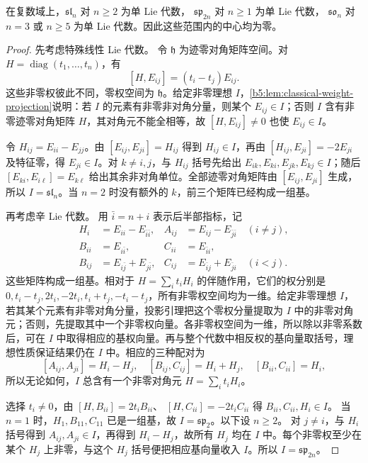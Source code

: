 \begin{proposition}\label{b5:prop:classical-simple}
	在复数域上，\(\mathfrak{sl}_n\) 对 \(n\ge2\) 为单 Lie 代数， \(\mathfrak{sp}_{2n}\) 对 \(n\ge1\) 为单 Lie 代数， \(\mathfrak{so}_n\) 对 \(n=3\) 或 \(n\ge5\) 为单 Lie 代数。因此这些范围内的中心均为零。
\end{proposition}
\begin{proof}
	先考虑特殊线性 Lie 代数。 令 \(\mathfrak h\) 为迹零对角矩阵空间。对 \(H=\operatorname{diag}(t_1,\ldots,t_n)\)，有
	\[
		[H,E_{ij}]=(t_i-t_j)E_{ij}.
	\]
	这些非零权彼此不同，零权空间为 \(\mathfrak h\)。给定非零理想 \(I\)，\cref{b5:lem:classical-weight-projection}说明：若 \(I\) 的元素有非零非对角分量，则某个 \(E_{ij}\in I\)；否则 \(I\) 含有非零迹零对角矩阵 \(H\)，其对角元不能全相等，故 \([H,E_{ij}]\ne0\) 也使 \(E_{ij}\in I\)。

	令 \(H_{ij}=E_{ii}-E_{jj}\)。由 \([E_{ij},E_{ji}]=H_{ij}\) 得到 \(H_{ij}\in I\)，再由 \([H_{ij},E_{ji}]=-2E_{ji}\) 及特征零，得 \(E_{ji}\in I\)。对 \(k\ne i,j\)，与 \(H_{ij}\) 括号先给出 \(E_{ik},E_{ki},E_{jk},E_{kj}\in I\)；随后 \([E_{ki},E_{i\ell}]=E_{k\ell}\) 给出其余非对角单位。全部迹零对角矩阵由 \([E_{ij},E_{ji}]\) 生成，所以 \(I=\mathfrak{sl}_n\)。当 \(n=2\) 时没有额外的 \(k\)，前三个矩阵已经构成一组基。

	再考虑辛 Lie 代数。 用 \(\bar i=n+i\) 表示后半部指标，记
	\[
		\begin{aligned}
			H_i&=E_{ii}-E_{\bar i\bar i},& A_{ij}&=E_{ij}-E_{\bar j\bar i}\quad(i\ne j),\\
			B_{ii}&=E_{i\bar i},& C_{ii}&=E_{\bar i i},\\
			B_{ij}&=E_{i\bar j}+E_{j\bar i},& C_{ij}&=E_{\bar i j}+E_{\bar j i}\quad(i<j).
		\end{aligned}
	\]
	这些矩阵构成一组基。相对于 \(H=\sum_i t_iH_i\) 的伴随作用，它们的权分别是 \(0,t_i-t_j,2t_i,-2t_i,t_i+t_j,-t_i-t_j\)，所有非零权空间均为一维。给定非零理想 \(I\)，若其某个元素有非零对角分量，投影引理把这个零权分量提取为 \(I\) 中的非零对角元；否则，先提取其中一个非零权向量。各非零权空间为一维，所以除以非零系数后，可在 \(I\) 中取得相应的基权向量。再与整个代数中相反权的基向量取括号，理想性质保证结果仍在 \(I\) 中。相应的三种配对为
	\[
		[A_{ij},A_{ji}]=H_i-H_j,\quad [B_{ij},C_{ij}]=H_i+H_j,\quad [B_{ii},C_{ii}]=H_i,
	\]
	所以无论如何，\(I\) 总含有一个非零对角元 \(H=\sum_i t_iH_i\)。

	选择 \(t_i\ne0\)，由 \([H,B_{ii}]=2t_iB_{ii}\)、 \([H,C_{ii}]=-2t_iC_{ii}\) 得 \(B_{ii},C_{ii},H_i\in I\)。 当 \(n=1\) 时，\(H_1,B_{11},C_{11}\) 已是一组基，故 \(I=\mathfrak{sp}_2\)。以下设 \(n\ge2\)。 对 \(j\ne i\)，与 \(H_i\) 括号得到 \(A_{ij},A_{ji}\in I\)，再得到 \(H_i-H_j\)，故所有 \(H_j\) 均在 \(I\) 中。每个非零权至少在某个 \(H_j\) 上非零，与这个 \(H_j\) 括号便把相应基向量收入 \(I\)。所以 \(I=\mathfrak{sp}_{2n}\)。


\end{proof}
